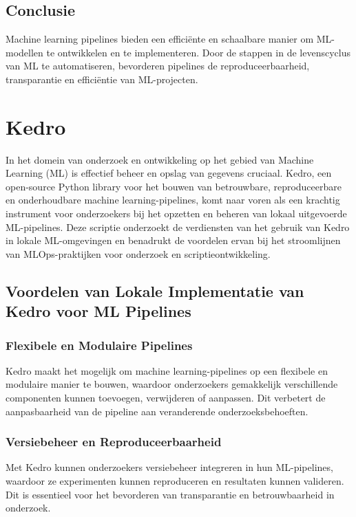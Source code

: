 \subsection{Conclusie}

Machine learning pipelines bieden een efficiënte en schaalbare manier om ML-modellen te ontwikkelen en te implementeren. Door de stappen in de levenscyclus van ML te automatiseren, bevorderen pipelines de reproduceerbaarheid, transparantie en efficiëntie van ML-projecten.
\section{Kedro}

In het domein van onderzoek en ontwikkeling op het gebied van Machine Learning (ML) is effectief beheer en opslag van gegevens cruciaal. Kedro, een open-source Python library voor het bouwen van betrouwbare, reproduceerbare en onderhoudbare machine learning-pipelines, komt naar voren als een krachtig instrument voor onderzoekers bij het opzetten en beheren van lokaal uitgevoerde ML-pipelines. Deze scriptie onderzoekt de verdiensten van het gebruik van Kedro in lokale ML-omgevingen en benadrukt de voordelen ervan bij het stroomlijnen van MLOps-praktijken voor onderzoek en scriptieontwikkeling.

\subsection{Voordelen van Lokale Implementatie van Kedro voor ML Pipelines}

\subsubsection{Flexibele en Modulaire Pipelines}
Kedro maakt het mogelijk om machine learning-pipelines op een flexibele en modulaire manier te bouwen, waardoor onderzoekers gemakkelijk verschillende componenten kunnen toevoegen, verwijderen of aanpassen. Dit verbetert de aanpasbaarheid van de pipeline aan veranderende onderzoeksbehoeften.

\subsubsection{Versiebeheer en Reproduceerbaarheid}
Met Kedro kunnen onderzoekers versiebeheer integreren in hun ML-pipelines, waardoor ze experimenten kunnen reproduceren en resultaten kunnen valideren. Dit is essentieel voor het bevorderen van transparantie en betrouwbaarheid in onderzoek.

